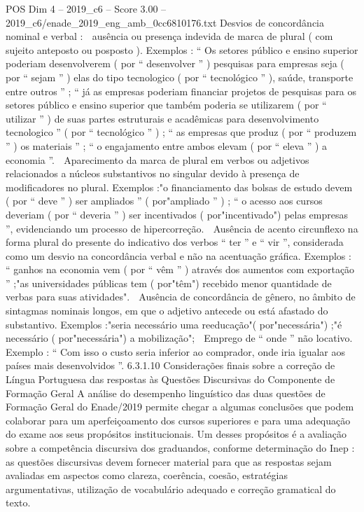 \begin{textsample}{POS Dim 4 – 2019\_c6 – Score 3.00 – 2019\_c6/enade\_2019\_eng\_amb\_0cc6810176.txt}
Desvios de concordância nominal e verbal :  ausência ou presença indevida de marca de plural ( com sujeito anteposto ou posposto ).
Exemplos : “ Os setores público e ensino superior poderiam desenvolverem ( por “ desenvolver ” ) pesquisas para empresas seja ( por “ sejam ” ) elas do tipo tecnologico ( por “ tecnológico ” ), saúde, transporte entre outros ” ; “ já as empresas poderiam financiar projetos de pesquisas para os setores público e ensino superior que também poderia se utilizarem ( por “ utilizar ” ) de suas partes estruturais e acadêmicas para desenvolvimento tecnologico ” ( por “ tecnológico ” ) ; “ as empresas que produz ( por “ produzem ” ) os materiais ” ; “ o engajamento entre ambos elevam ( por “ eleva ” ) a economia ”.  Aparecimento da marca de plural em verbos ou adjetivos relacionados a núcleos substantivos no singular devido à presença de modificadores no plural.
Exemplos :"o financiamento das bolsas de estudo devem ( por “ deve ” ) ser ampliados ” ( por"ampliado ” ) ; “ o acesso aos cursos deveriam ( por “ deveria ” ) ser incentivados ( por"incentivado") pelas empresas ”, evidenciando um processo de hipercorreção.  Ausência de acento circunflexo na forma plural do presente do indicativo dos verbos “ ter ” e “ vir ”, considerada como um desvio na concordância verbal e não na acentuação gráfica.
Exemplos : “ ganhos na economia vem ( por “ vêm ” ) através dos aumentos com exportação ” ;"as universidades públicas tem ( por"têm") recebido menor quantidade de verbas para suas atividades".  Ausência de concordância de gênero, no âmbito de sintagmas nominais longos, em que o adjetivo antecede ou está afastado do substantivo.
Exemplos :"seria necessário uma reeducação"( por"necessária") ;"é necessário ( por"necessária") a mobilização";  Emprego de “ onde ” não locativo.
Exemplo : “ Com isso o custo seria inferior ao comprador, onde iria igualar aos países mais desenvolvidos ”. 6.3.1.10 Considerações finais sobre a correção de Língua Portuguesa das respostas às Questões Discursivas do Componente de Formação Geral A análise do desempenho linguístico das duas questões de Formação Geral do Enade/2019 permite chegar a algumas conclusões que podem colaborar para um aperfeiçoamento dos cursos superiores e para uma adequação do exame aos seus propósitos institucionais.
Um desses propósitos é a avaliação sobre a competência discursiva dos graduandos, conforme determinação do Inep : as questões discursivas devem fornecer material para que as respostas sejam avaliadas em aspectos como clareza, coerência, coesão, estratégias argumentativas, utilização de vocabulário adequado e correção gramatical do texto.

\end{textsample}
